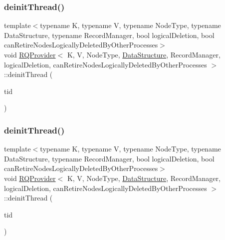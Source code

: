\mbox{\label{classRQProvider_a3f20b96dfa5a47d9f59ada98e3322695}} 
\subsubsection{\texorpdfstring{deinit\+Thread()}{deinitThread()}\hspace{0.1cm}{\footnotesize\ttfamily [3/5]}}
{\footnotesize\ttfamily template$<$typename K, typename V, typename Node\+Type, typename Data\+Structure, typename Record\+Manager, bool logical\+Deletion, bool can\+Retire\+Nodes\+Logically\+Deleted\+By\+Other\+Processes$>$ \\
void \hyperlink{classRQProvider}{R\+Q\+Provider}$<$ K, V, Node\+Type, \hyperlink{classDataStructure}{Data\+Structure}, Record\+Manager, logical\+Deletion, can\+Retire\+Nodes\+Logically\+Deleted\+By\+Other\+Processes $>$\+::deinit\+Thread (\begin{DoxyParamCaption}\item[{const int}]{tid }\end{DoxyParamCaption})\hspace{0.3cm}{\ttfamily [inline]}}

\mbox{\label{classRQProvider_a3f20b96dfa5a47d9f59ada98e3322695}} 
\subsubsection{\texorpdfstring{deinit\+Thread()}{deinitThread()}\hspace{0.1cm}{\footnotesize\ttfamily [4/5]}}
{\footnotesize\ttfamily template$<$typename K, typename V, typename Node\+Type, typename Data\+Structure, typename Record\+Manager, bool logical\+Deletion, bool can\+Retire\+Nodes\+Logically\+Deleted\+By\+Other\+Processes$>$ \\
void \hyperlink{classRQProvider}{R\+Q\+Provider}$<$ K, V, Node\+Type, \hyperlink{classDataStructure}{Data\+Structure}, Record\+Manager, logical\+Deletion, can\+Retire\+Nodes\+Logically\+Deleted\+By\+Other\+Processes $>$\+::deinit\+Thread (\begin{DoxyParamCaption}\item[{const int}]{tid }\end{DoxyParamCaption})\hspace{0.3cm}{\ttfamily [inline]}}

